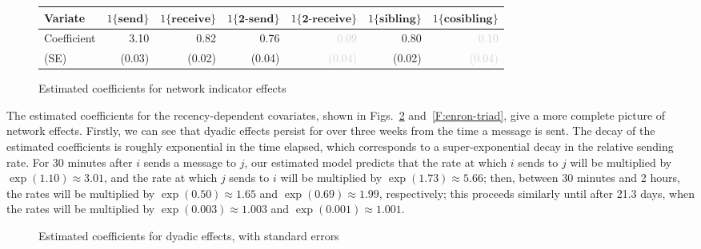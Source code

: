 \documentclass[final]{statsoc}
\begin{document}
\begin{figure}
\centering
\footnotesize
\begin{tabular}{lrrrrrr}
\toprule
Variate
& $1\{\textbf{send}\}$
& $1\{\textbf{receive}\}$
& $1\{\textbf{2-send}\}$
& $1\{\textbf{2-receive}\}$
& $1\{\textbf{sibling}\}$
& $1\{\textbf{cosibling}\}$
\\
\midrule
Coefficient
& 3.10
& 0.82
& 0.76
& \textcolor{LightGray}{0.09}
& 0.80
& \textcolor{LightGray}{0.10}
\\
(SE)
& \tiny{(0.03)}
& \tiny{(0.02)}
& \tiny{(0.04)}
& \textcolor{LightGray}{\tiny{(0.04)}}
& \tiny{(0.02)}
& \textcolor{LightGray}{\tiny{(0.04)}}
\\
\bottomrule
\end{tabular}
\normalsize
\caption{Estimated coefficients for network indicator effects}
\label{F:enron-net-indicator}
\end{figure}

The estimated coefficients for the recency-dependent covariates, shown in
Figs.~\ref{F:enron-dyad} and~\ref{F:enron-triad}, give a more complete
picture of network effects.  Firstly, we can see that dyadic effects
persist for over three weeks from the time a message is sent.  The decay of
the estimated coefficients is roughly exponential in the time elapsed, which
corresponds to a super-exponential decay in the relative sending rate.  For 30
minutes after $i$ sends a message to $j$, our estimated model predicts that
the rate at which $i$ sends to $j$ will be multiplied by $\exp(1.10) \approx
3.01$, and the rate at which $j$ sends to $i$ will be multiplied by $\exp(1.73)
\approx 5.66$; then, between 30 minutes and 2 hours, the rates will be
multiplied by $\exp(0.50) \approx 1.65$ and $\exp(0.69) \approx 1.99$,
respectively; this proceeds similarly until after 21.3 days, when the rates
will be multiplied by $\exp(0.003) \approx 1.003$ and $\exp(0.001) \approx
1.001$.

\begin{figure}
  \centering
  \caption{Estimated coefficients for dyadic effects, with standard errors}
  \label{F:enron-dyad}
\end{figure}
\end{document}
